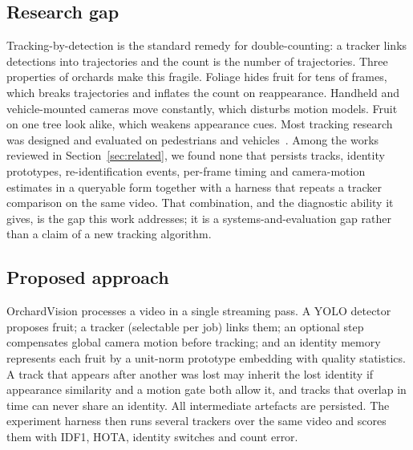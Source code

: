 \documentclass[11pt,a4paper]{article}
\begin{document}
\subsection{Research gap}
Tracking-by-detection is the standard remedy for double-counting: a tracker links detections into trajectories and the count is the number of trajectories. Three properties of orchards make this fragile. Foliage hides fruit for tens of frames, which breaks trajectories and inflates the count on reappearance. Handheld and vehicle-mounted cameras move constantly, which disturbs motion models. Fruit on one tree look alike, which weakens appearance cues. Most tracking research was designed and evaluated on pedestrians and vehicles~\cite{bewley2016sort,wojke2017deepsort,zhang2022bytetrack,aharon2022botsort}. Among the works reviewed in Section~\ref{sec:related}, we found none that persists tracks, identity prototypes, re-identification events, per-frame timing and camera-motion estimates in a queryable form together with a harness that repeats a tracker comparison on the same video. That combination, and the diagnostic ability it gives, is the gap this work addresses; it is a systems-and-evaluation gap rather than a claim of a new tracking algorithm.

\subsection{Proposed approach}
OrchardVision processes a video in a single streaming pass. A YOLO detector~\cite{redmon2016yolo,ultralytics} proposes fruit; a tracker (selectable per job) links them; an optional step compensates global camera motion before tracking; and an identity memory represents each fruit by a unit-norm prototype embedding with quality statistics. A track that appears after another was lost may inherit the lost identity if appearance similarity and a motion gate both allow it, and tracks that overlap in time can never share an identity. All intermediate artefacts are persisted. The experiment harness then runs several trackers over the same video and scores them with IDF1, HOTA, identity switches and count error.
\end{document}
